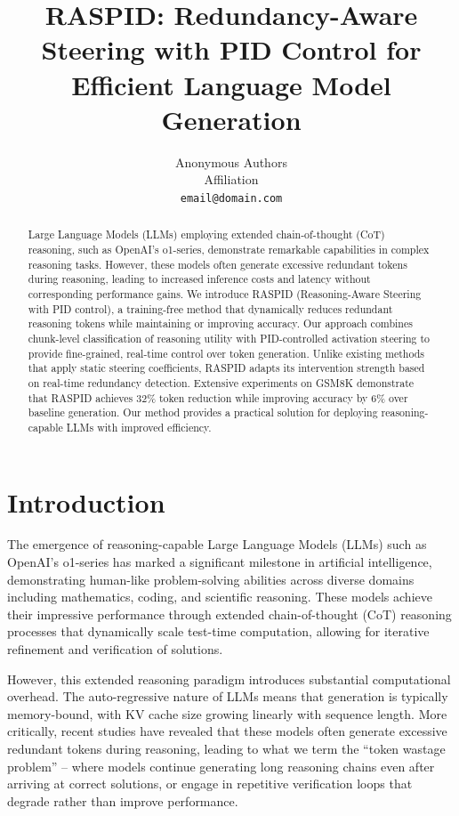 \documentclass{article}
\title{RASPID: Redundancy-Aware Steering with PID Control for Efficient Language Model Generation}
\author{
Anonymous Authors\\
Affiliation\\
\texttt{email@domain.com}
}
\date{}
\begin{document}
\maketitle

\begin{abstract}
Large Language Models (LLMs) employing extended chain-of-thought (CoT) reasoning, such as OpenAI's o1-series, demonstrate remarkable capabilities in complex reasoning tasks. However, these models often generate excessive redundant tokens during reasoning, leading to increased inference costs and latency without corresponding performance gains. We introduce RASPID (Reasoning-Aware Steering with PID control), a training-free method that dynamically reduces redundant reasoning tokens while maintaining or improving accuracy. Our approach combines chunk-level classification of reasoning utility with PID-controlled activation steering to provide fine-grained, real-time control over token generation. Unlike existing methods that apply static steering coefficients, RASPID adapts its intervention strength based on real-time redundancy detection. Extensive experiments on GSM8K demonstrate that RASPID achieves 32\% token reduction while improving accuracy by 6\% over baseline generation. Our method provides a practical solution for deploying reasoning-capable LLMs with improved efficiency.
\end{abstract}

\section{Introduction}

The emergence of reasoning-capable Large Language Models (LLMs) such as OpenAI's o1-series has marked a significant milestone in artificial intelligence, demonstrating human-like problem-solving abilities across diverse domains including mathematics, coding, and scientific reasoning. These models achieve their impressive performance through extended chain-of-thought (CoT) reasoning processes that dynamically scale test-time computation, allowing for iterative refinement and verification of solutions.

However, this extended reasoning paradigm introduces substantial computational overhead. The auto-regressive nature of LLMs means that generation is typically memory-bound, with KV cache size growing linearly with sequence length. More critically, recent studies have revealed that these models often generate excessive redundant tokens during reasoning, leading to what we term the ``token wastage problem'' -- where models continue generating long reasoning chains even after arriving at correct solutions, or engage in repetitive verification loops that degrade rather than improve performance.
\end{document}
